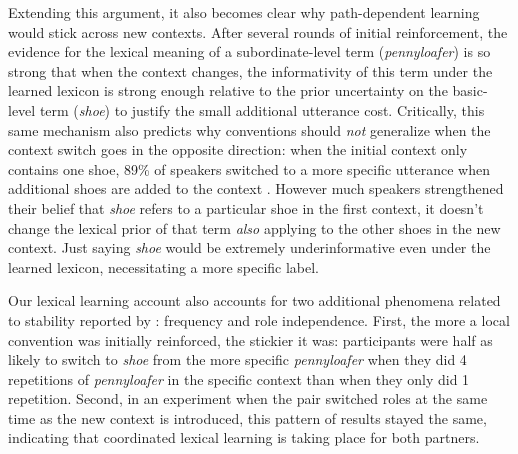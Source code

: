 Extending this argument, it also becomes clear why path-dependent learning would stick across new contexts.  After several rounds of initial reinforcement, the evidence for the lexical meaning of a subordinate-level term (\emph{pennyloafer}) is so strong that when the context changes, the informativity of this term under the learned lexicon is strong enough relative to the prior uncertainty on the basic-level term (\emph{shoe}) to justify the small additional utterance cost. Critically, this same mechanism also predicts why conventions should \emph{not} generalize when the context switch goes in the opposite direction: when the initial context only contains one shoe, 89\% of speakers switched to a more specific utterance when additional shoes are added to the context \cite{BrennanClark96_ConceptualPactsConversation}. However much speakers strengthened their belief that \emph{shoe} refers to a particular shoe in the first context, it doesn't change the lexical prior of that term \emph{also} applying to the other shoes in the new context. Just saying \emph{shoe} would be extremely underinformative even under the learned lexicon, necessitating a more specific label.

Our lexical learning account also accounts for two additional phenomena related to stability reported by : frequency and role independence. First, the more a local convention was initially reinforced, the stickier it was: participants were half as likely to switch to \emph{shoe} from the more specific \emph{pennyloafer} when they did 4 repetitions of \emph{pennyloafer} in the specific context than when they only did 1 repetition. Second, in an experiment when the pair switched roles at the same time as the new context is introduced, this pattern of results stayed the same, indicating that coordinated lexical learning is taking place for both partners. 

